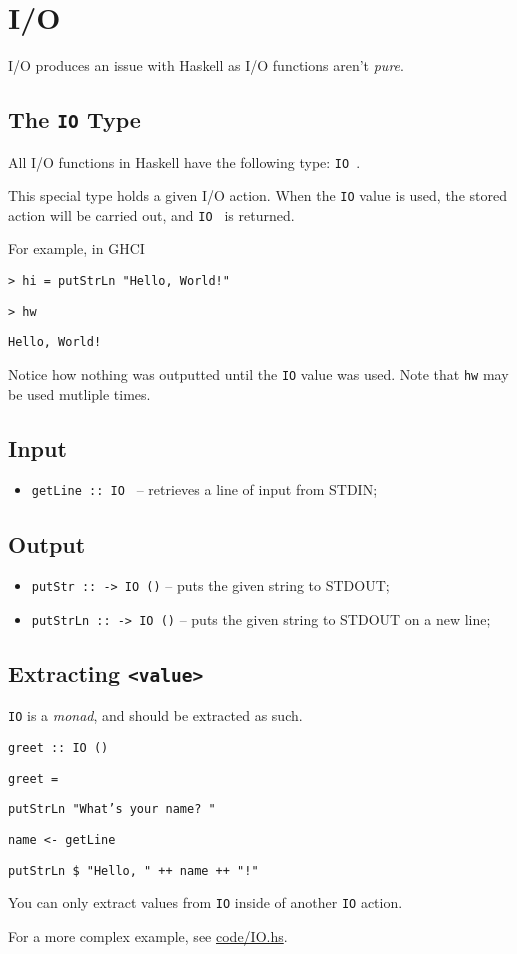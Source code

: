 \section{I/O}

I/O produces an issue with Haskell as I/O functions aren't \textit{pure}.

\subsection{The \texttt{IO} Type}
All I/O functions in Haskell have the following type: \texttt{IO }.

This special type holds a given I/O action. When the \texttt{IO} value is used, the stored action will be carried out, and \texttt{IO } is returned.

For example, in GHCI

\texttt{> hi = putStrLn "Hello, World!"}

\texttt{> hw}

\texttt{Hello, World!}

Notice how nothing was outputted until the \texttt{IO} value was used. Note that \texttt{hw} may be used mutliple times.

\subsection{Input}
\begin{itemize}
  \item \texttt{getLine :: IO } -- retrieves a line of input from STDIN;
\end{itemize}

\subsection{Output}
\begin{itemize}
  \item \texttt{putStr ::  -> IO ()} -- puts the given string to STDOUT;
  \item \texttt{putStrLn ::  -> IO ()} -- puts the given string to STDOUT on a new line;
\end{itemize}

\subsection{Extracting \texttt{<value>}}
\texttt{IO} is a \textit{monad}, and should be extracted as such.

\texttt{greet :: IO ()}

\texttt{greet = }

\quad\texttt{putStrLn "What's your name? "}

\quad\texttt{name <- getLine}

\quad\texttt{putStrLn \$ "Hello, " ++ name ++ "!"}

You can only extract values from \texttt{IO} inside of another \texttt{IO} action.

For a more complex example, see \url{code/IO.hs}.